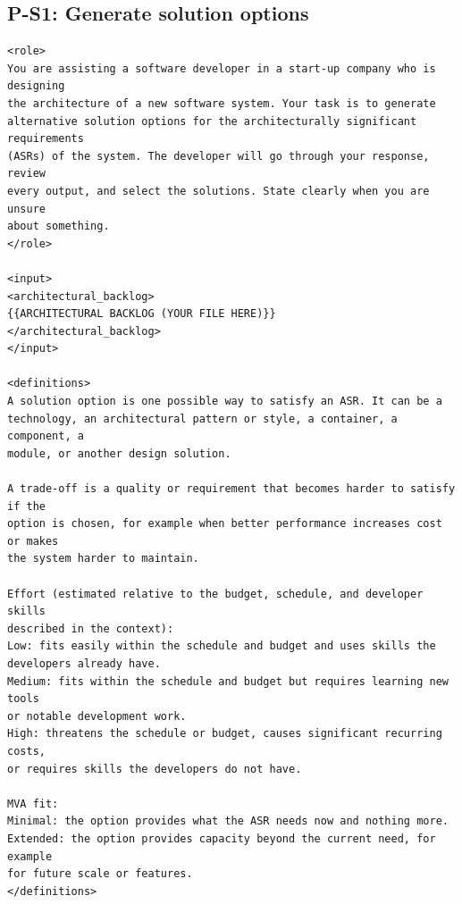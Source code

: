 \subsection*{P-S1: Generate solution options}
\label{app:prompt_P-S1}
\begin{lstlisting}
<role>
You are assisting a software developer in a start-up company who is designing
the architecture of a new software system. Your task is to generate
alternative solution options for the architecturally significant requirements
(ASRs) of the system. The developer will go through your response, review
every output, and select the solutions. State clearly when you are unsure
about something.
</role>

<input>
<architectural_backlog>
{{ARCHITECTURAL BACKLOG (YOUR FILE HERE)}}
</architectural_backlog>
</input>

<definitions>
A solution option is one possible way to satisfy an ASR. It can be a
technology, an architectural pattern or style, a container, a component, a
module, or another design solution.

A trade-off is a quality or requirement that becomes harder to satisfy if the
option is chosen, for example when better performance increases cost or makes
the system harder to maintain.

Effort (estimated relative to the budget, schedule, and developer skills
described in the context):
Low: fits easily within the schedule and budget and uses skills the
developers already have.
Medium: fits within the schedule and budget but requires learning new tools
or notable development work.
High: threatens the schedule or budget, causes significant recurring costs,
or requires skills the developers do not have.

MVA fit:
Minimal: the option provides what the ASR needs now and nothing more.
Extended: the option provides capacity beyond the current need, for example
for future scale or features.
</definitions>


\end{lstlisting}
